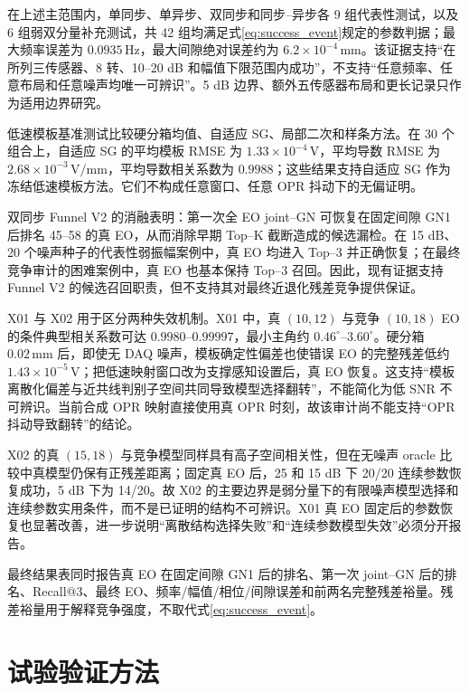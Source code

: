 \documentclass[UTF8,12pt,a4paper]{ctexart}
\begin{document}
在上述主范围内，单同步、单异步、双同步和同步--异步各 9 组代表性测试，以及 6 组弱双分量补充测试，共 42 组均满足式\eqref{eq:success_event}规定的参数判据；最大频率误差为 $0.0935\,\mathrm{Hz}$，最大间隙绝对误差约为 $6.2\times10^{-4}\,\mathrm{mm}$。该证据支持“在所列三传感器、8 转、10--20 dB 和幅值下限范围内成功”，不支持“任意频率、任意布局和任意噪声均唯一可辨识”。5 dB 边界、额外五传感器布局和更长记录只作为适用边界研究。

低速模板基准测试比较硬分箱均值、自适应 SG、局部二次和样条方法。在 30 个组合上，自适应 SG 的平均模板 RMSE 为 $1.33\times10^{-4}\,\mathrm V$，平均导数 RMSE 为 $2.68\times10^{-3}\,\mathrm{V/mm}$，平均导数相关系数为 $0.9988$；这些结果支持自适应 SG 作为冻结低速模板方法。它们不构成任意窗口、任意 OPR 抖动下的无偏证明。

双同步 Funnel V2 的消融表明：第一次全 EO joint--GN 可恢复在固定间隙 GN1 后排名 45--58 的真 EO，从而消除早期 Top--K 截断造成的候选漏检。在 15 dB、20 个噪声种子的代表性弱振幅案例中，真 EO 均进入 Top--3 并正确恢复；在最终竞争审计的困难案例中，真 EO 也基本保持 Top--3 召回。因此，现有证据支持 Funnel V2 的候选召回职责，但不支持其对最终近退化残差竞争提供保证。

X01 与 X02 用于区分两种失效机制。X01 中，真 $(10,12)$ 与竞争 $(10,18)$ EO 的条件典型相关系数可达 $0.9980$--$0.99997$，最小主角约 $0.46^\circ$--$3.60^\circ$。硬分箱 $0.02\,\mathrm{mm}$ 后，即使无 DAQ 噪声，模板确定性偏差也使错误 EO 的完整残差低约 $1.43\times10^{-5}\,\mathrm V$；把低速映射窗口改为支撑感知设置后，真 EO 恢复。这支持“模板离散化偏差与近共线判别子空间共同导致模型选择翻转”，不能简化为低 SNR 不可辨识。当前合成 OPR 映射直接使用真 OPR 时刻，故该审计尚不能支持“OPR 抖动导致翻转”的结论。

X02 的真 $(15,18)$ 与竞争模型同样具有高子空间相关性，但在无噪声 oracle 比较中真模型仍保有正残差距离；固定真 EO 后，25 和 15 dB 下 20/20 连续参数恢复成功，5 dB 下为 14/20。故 X02 的主要边界是弱分量下的有限噪声模型选择和连续参数实用条件，而不是已证明的结构不可辨识。X01 真 EO 固定后的参数恢复也显著改善，进一步说明“离散结构选择失败”和“连续参数模型失效”必须分开报告。

最终结果表同时报告真 EO 在固定间隙 GN1 后的排名、第一次 joint--GN 后的排名、Recall@3、最终 EO、频率/幅值/相位/间隙误差和前两名完整残差裕量。残差裕量用于解释竞争强度，不取代式\eqref{eq:success_event}。

\section{试验验证方法}
\end{document}
